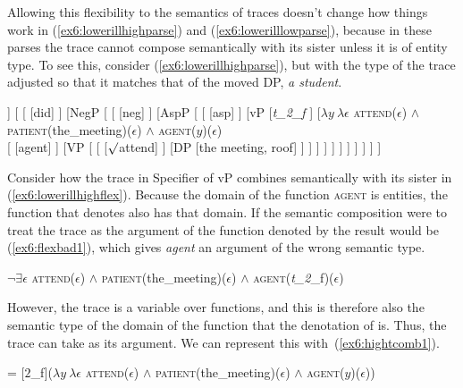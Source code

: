 Allowing this flexibility to the semantics of traces doesn't change how things work in (\ref{ex6:lowerillhighparse}) and (\ref{ex6:lowerilllowparse}), because in these parses the trace cannot compose semantically with its sister unless it is of entity type. To see this, consider (\ref{ex6:lowerillhighparse}), but with the type of the trace adjusted so that it matches that of the moved DP, \emph{a student}.
\medskip
\begin{fullwidth}
\begin{exe}
\raggedright
	\ex \label{ex6:lowerillhighflex}
	\small
	\begin{forest}
	[TP
		[$\lambda P\ \exists x$ \textsc{student}($x$) $\wedge$ $P(x)$\\DP [a student, roof] ]
		[
			[ [did] ]
			[NegP [
				[ [neg] ]
				[AspP [
					[ [asp] ]
					[vP 
						[\emph{t_{2}_{f}} ]
						[$\lambda y\ \lambda \epsilon$ \textsc{attend}($\epsilon$)  $\wedge$ \textsc{patient}(the\_meeting)($\epsilon$) $\wedge$ \textsc{agent}($y$)($\epsilon$) \\
							[ [agent] ]
							[VP [
								[ [$\surd$attend] ]
								[DP [the meeting, roof] ]
							] ]
						 ]
					 ]
				] ]
			] ]
		 ]
	]
	\end{forest}
\end{exe}
\end{fullwidth}
\medskip
Consider how the trace in Specifier of vP combines semantically with its  sister in (\ref{ex6:lowerillhighflex}). Because the domain of the function \textsc{agent} is entities, the function that  denotes also has that domain. If the semantic composition were to treat the trace as the argument of the function denoted by  the result would be (\ref{ex6:flexbad1}), which gives \emph{agent} an argument of the wrong semantic type.
\begin{exe}
\raggedright
	\ex \label{ex6:flexbad1}
	$\neg \exists \epsilon$ \textsc{attend}($\epsilon$) $\wedge$ \textsc{patient}(the\_meeting)($\epsilon$) $\wedge$ \textsc{agent}(\emph{t_2}_{f})($\epsilon$)
\end{exe}
However, the trace is a variable over functions, and this is therefore also the semantic type of the domain of the function that the denotation of  is. Thus, the trace can take  as its argument. We can represent this with~(\ref{ex6:hightcomb1}).
\begin{exe}
\raggedright
	\ex \label{ex6:hightcomb1}
	 = [$2$_{f}]($\lambda y\ \lambda \epsilon$ \textsc{attend}($\epsilon$) $\wedge$ \textsc{patient}(the\_meeting)($\epsilon$) $\wedge$ \textsc{agent}($y$)($\epsilon$))
\end{exe}
